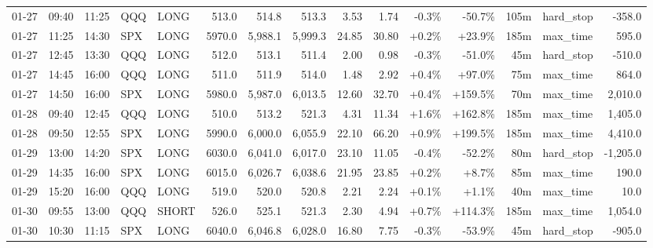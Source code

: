 \documentclass[11pt,a4paper,twoside]{article}
\begin{document}
\begin{landscape}
\begin{center}
\begin{longtable}{>{\color{txtmain}}l l l l l r r r r r r r r >{\color{txtmain}}l r}
01-27 & 09:40 & 11:25 & QQQ & LONG & 513.0 & 514.8 & 513.3 & 3.53 & 1.74 & \textcolor{lossred}{-0.3\%} & \textcolor{lossred}{-50.7\%} & 105m & hard\_stop & \textcolor{lossred}{-358.0} \\
01-27 & 11:25 & 14:30 & SPX & LONG & 5970.0 & 5,988.1 & 5,999.3 & 24.85 & 30.80 & \textcolor{wingreen}{+0.2\%} & \textcolor{wingreen}{+23.9\%} & 185m & max\_time & \textcolor{wingreen}{595.0} \\
01-27 & 12:45 & 13:30 & QQQ & LONG & 512.0 & 513.1 & 511.4 & 2.00 & 0.98 & \textcolor{lossred}{-0.3\%} & \textcolor{lossred}{-51.0\%} & 45m & hard\_stop & \textcolor{lossred}{-510.0} \\
01-27 & 14:45 & 16:00 & QQQ & LONG & 511.0 & 511.9 & 514.0 & 1.48 & 2.92 & \textcolor{wingreen}{+0.4\%} & \textcolor{wingreen}{+97.0\%} & 75m & max\_time & \textcolor{wingreen}{864.0} \\
01-27 & 14:50 & 16:00 & SPX & LONG & 5980.0 & 5,987.0 & 6,013.5 & 12.60 & 32.70 & \textcolor{wingreen}{+0.4\%} & \textcolor{wingreen}{+159.5\%} & 70m & max\_time & \textcolor{wingreen}{2,010.0} \\
01-28 & 09:40 & 12:45 & QQQ & LONG & 510.0 & 513.2 & 521.3 & 4.31 & 11.34 & \textcolor{wingreen}{+1.6\%} & \textcolor{wingreen}{+162.8\%} & 185m & max\_time & \textcolor{wingreen}{1,405.0} \\
01-28 & 09:50 & 12:55 & SPX & LONG & 5990.0 & 6,000.0 & 6,055.9 & 22.10 & 66.20 & \textcolor{wingreen}{+0.9\%} & \textcolor{wingreen}{+199.5\%} & 185m & max\_time & \textcolor{wingreen}{4,410.0} \\
01-29 & 13:00 & 14:20 & SPX & LONG & 6030.0 & 6,041.0 & 6,017.0 & 23.10 & 11.05 & \textcolor{lossred}{-0.4\%} & \textcolor{lossred}{-52.2\%} & 80m & hard\_stop & \textcolor{lossred}{-1,205.0} \\
01-29 & 14:35 & 16:00 & SPX & LONG & 6015.0 & 6,026.7 & 6,038.6 & 21.95 & 23.85 & \textcolor{wingreen}{+0.2\%} & \textcolor{wingreen}{+8.7\%} & 85m & max\_time & \textcolor{wingreen}{190.0} \\
01-29 & 15:20 & 16:00 & QQQ & LONG & 519.0 & 520.0 & 520.8 & 2.21 & 2.24 & \textcolor{wingreen}{+0.1\%} & \textcolor{wingreen}{+1.1\%} & 40m & max\_time & \textcolor{wingreen}{10.0} \\
01-30 & 09:55 & 13:00 & QQQ & SHORT & 526.0 & 525.1 & 521.3 & 2.30 & 4.94 & \textcolor{wingreen}{+0.7\%} & \textcolor{wingreen}{+114.3\%} & 185m & max\_time & \textcolor{wingreen}{1,054.0} \\
01-30 & 10:30 & 11:15 & SPX & LONG & 6040.0 & 6,046.8 & 6,028.0 & 16.80 & 7.75 & \textcolor{lossred}{-0.3\%} & \textcolor{lossred}{-53.9\%} & 45m & hard\_stop & \textcolor{lossred}{-905.0} \\

\end{longtable}
\end{center}
\end{landscape}
\end{document}
